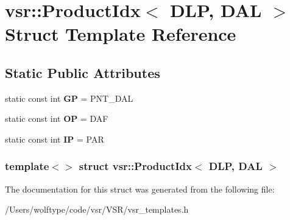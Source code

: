 \hypertarget{structvsr_1_1_product_idx_3_01_d_l_p_00_01_d_a_l_01_4}{\section{vsr\-:\-:Product\-Idx$<$ D\-L\-P, D\-A\-L $>$ Struct Template Reference}
\label{structvsr_1_1_product_idx_3_01_d_l_p_00_01_d_a_l_01_4}
}
\subsection*{Static Public Attributes}
\begin{DoxyCompactItemize}
\item 
\hypertarget{structvsr_1_1_product_idx_3_01_d_l_p_00_01_d_a_l_01_4_acd6a7670276c27ad7b7ad0fdae429d16}{static const int {\bfseries G\-P} = P\-N\-T\-\_\-\-D\-A\-L}\label{structvsr_1_1_product_idx_3_01_d_l_p_00_01_d_a_l_01_4_acd6a7670276c27ad7b7ad0fdae429d16}

\item 
\hypertarget{structvsr_1_1_product_idx_3_01_d_l_p_00_01_d_a_l_01_4_a59401390702e397dbd3e64df028563c5}{static const int {\bfseries O\-P} = D\-A\-F}\label{structvsr_1_1_product_idx_3_01_d_l_p_00_01_d_a_l_01_4_a59401390702e397dbd3e64df028563c5}

\item 
\hypertarget{structvsr_1_1_product_idx_3_01_d_l_p_00_01_d_a_l_01_4_a6194b483f1c7cf39d2c463c45c7905fa}{static const int {\bfseries I\-P} = P\-A\-R}\label{structvsr_1_1_product_idx_3_01_d_l_p_00_01_d_a_l_01_4_a6194b483f1c7cf39d2c463c45c7905fa}

\end{DoxyCompactItemize}
\subsubsection*{template$<$$>$ struct vsr\-::\-Product\-Idx$<$ D\-L\-P, D\-A\-L $>$}



The documentation for this struct was generated from the following file\-:\begin{DoxyCompactItemize}
\item 
/\-Users/wolftype/code/vsr/\-V\-S\-R/vsr\-\_\-templates.\-h\end{DoxyCompactItemize}
